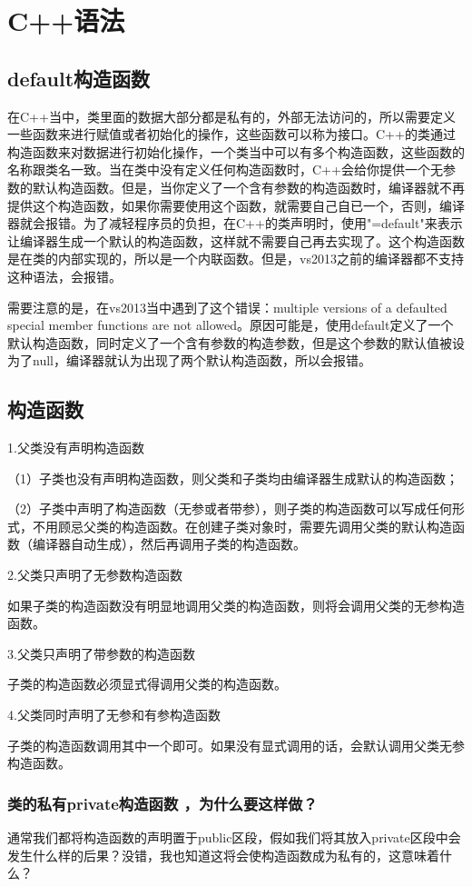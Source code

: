 \section{C++语法} 
\subsection{default构造函数}
在C++当中，类里面的数据大部分都是私有的，外部无法访问的，所以需要定义一些函数来进行赋值或者初始化的操作，这些函数可以称为接口。C++的类通过构造函数来对数据进行初始化操作，一个类当中可以有多个构造函数，这些函数的名称跟类名一致。当在类中没有定义任何构造函数时，C++会给你提供一个无参数的默认构造函数。但是，当你定义了一个含有参数的构造函数时，编译器就不再提供这个构造函数，如果你需要使用这个函数，就需要自己自已一个，否则，编译器就会报错。为了减轻程序员的负担，在C++的类声明时，使用"=default"来表示让编译器生成一个默认的构造函数，这样就不需要自己再去实现了。这个构造函数是在类的内部实现的，所以是一个内联函数。但是，vs2013之前的编译器都不支持这种语法，会报错。

需要注意的是，在vs2013当中遇到了这个错误：multiple versions of a defaulted special member functions are not allowed。原因可能是，使用default定义了一个默认构造函数，同时定义了一个含有参数的构造参数，但是这个参数的默认值被设为了null，编译器就认为出现了两个默认构造函数，所以会报错。  
\subsection{构造函数}
1.父类没有声明构造函数

（1）子类也没有声明构造函数，则父类和子类均由编译器生成默认的构造函数；

（2）子类中声明了构造函数（无参或者带参），则子类的构造函数可以写成任何形式，不用顾忌父类的构造函数。在创建子类对象时，需要先调用父类的默认构造函数（编译器自动生成），然后再调用子类的构造函数。

2.父类只声明了无参数构造函数

如果子类的构造函数没有明显地调用父类的构造函数，则将会调用父类的无参构造函数。

3.父类只声明了带参数的构造函数

子类的构造函数必须显式得调用父类的构造函数。

4.父类同时声明了无参和有参构造函数

子类的构造函数调用其中一个即可。如果没有显式调用的话，会默认调用父类无参构造函数。
\subsubsection{类的私有private构造函数 ，为什么要这样做？}
通常我们都将构造函数的声明置于public区段，假如我们将其放入private区段中会发生什么样的后果？没错，我也知道这将会使构造函数成为私有的，这意味着什么？

